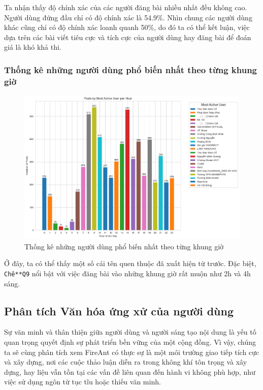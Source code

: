 Ta nhận thấy độ chính xác của các người đăng bài nhiều nhất đều không cao. Người dùng đứng đầu chỉ có độ chính xác là 54.9\%. Nhìn chung các người dùng khác cũng chỉ có độ chính xác loanh quanh 50\%, do đó ta có thể kết luận, việc dựa trên các bài viết tiêu cực và tích cực của người dùng hay đăng bài để đoán giá là khó khả thi.

\subsubsection{Thống kê những người dùng phổ biến nhất theo từng khung giờ}
\vspace{-1em}
\begin{figure}[H]
    \centering
    \includegraphics[width = 1\linewidth]{images/C2_pic55.png}
    \vspace{-2em}
    \caption{Thống kê những người dùng phổ biến nhất theo từng khung giờ}
    \label{fig:2.22}
\end{figure}
\vspace{-0.5em}
Ở đây, ta có thể thấy một số cái tên quen thuộc đã xuất hiện từ trước. Đặc biệt, \texttt{Chê**Q9} nổi bật với việc đăng bài vào những khung giờ rất muộn như 2h và 4h sáng.

\subsection{Phân tích Văn hóa ứng xử của người dùng}
Sự văn minh và thân thiện giữa người dùng và người sáng tạo nội dung là yếu tố quan trọng quyết định sự phát triển bền vững của một cộng đồng. Vì vậy, chúng ta sẽ cùng phân tích xem FireAnt có thực sự là một môi trường giao tiếp tích cực và xây dựng, nơi các cuộc thảo luận diễn ra trong không khí tôn trọng và xây dựng, hay liệu vẫn tồn tại các vấn đề liên quan đến hành vi không phù hợp, như việc sử dụng ngôn từ tục tĩu hoặc thiếu văn minh.\\

